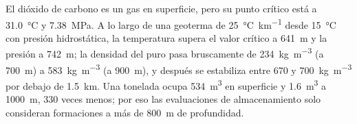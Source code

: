 El dióxido de carbono es un gas en superficie, pero su punto crítico está a \qty{31.0}{\celsius} y
\qty{7.38}{MPa}. A lo largo de una geoterma de \qty{25}{\celsius\per\km} desde \qty{15}{\celsius} con
presión hidrostática, la temperatura supera el valor crítico a \qty{641}{m} y la presión a
\qty{742}{m}; la densidad del  puro pasa bruscamente de \qty{234}{kg.m^{-3}} (a \qty{700}{m}) a
\qty{583}{kg.m^{-3}} (a \qty{900}{m}), y después se estabiliza entre 670 y \qty{700}{kg.m^{-3}} por debajo de
\qty{1.5}{km}. Una tonelada ocupa \qty{534}{m^3} en superficie y \qty{1.6}{m^3} a \qty{1000}{m},
330 veces menos; por eso las evaluaciones de almacenamiento solo consideran formaciones a más de
\qty{800}{m} de profundidad.

